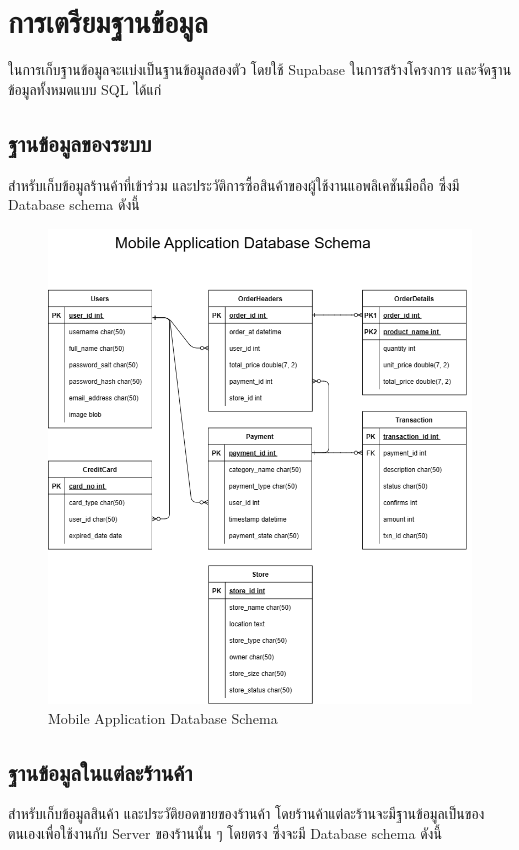 \section{การเตรียมฐานข้อมูล}
ในการเก็บฐานข้อมูลจะแบ่งเป็นฐานข้อมูลสองตัว โดยใช้ Supabase 
ในการสร้างโครงการ และจัดฐานข้อมูลทั้งหมดแบบ SQL ได้แก่ 
\subsection{ฐานข้อมูลของระบบ}
สำหรับเก็บข้อมูลร้านค้าที่เข้าร่วม และประวัติการซื้อสินค้าของผู้ใช้งานแอพลิเคชันมือถือ ซึ่งมี Database schema ดังนี้ 
\begin{figure}[h]
\begin{center}
 
  \includegraphics[scale=0.3]{pic/datamobile.png}
  \end{center}
  
  \caption[Mobile Application Database Schema]{Mobile Application Database Schema}
  \label{fig:Mobile Application Database Schema}
  \end{figure}


  
\subsection{ฐานข้อมูลในแต่ละร้านค้า}
สำหรับเก็บข้อมูลสินค้า และประวัติยอดขายของร้านค้า โดยร้านค้าแต่ละร้านจะมีฐานข้อมูลเป็นของตนเองเพื่อใช้งานกับ Server ของร้านนั้น ๆ
 โดยตรง ซึ่งจะมี Database schema ดังนี้ 

